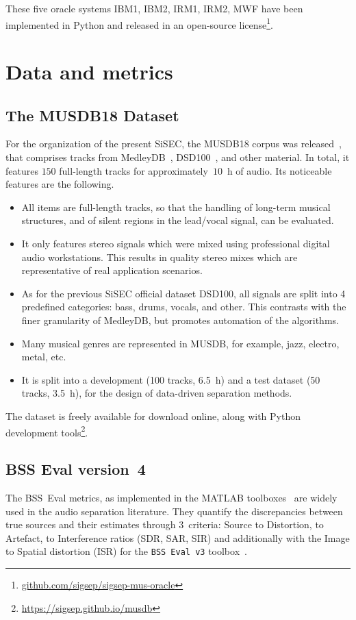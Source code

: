 \documentclass{llncs}
\begin{document}
These five oracle systems IBM1, IBM2, IRM1, IRM2, MWF have been implemented in Python and released in an open-source license\footnote{\url{github.com/sigsep/sigsep-mus-oracle}}.

\section{Data and metrics}

\subsection{The MUSDB18 Dataset}
For the organization of the present SiSEC, the MUSDB18 corpus was released~\cite{musdb18}, that comprises tracks from MedleyDB~\cite{medleydb}, DSD100~\cite{sisec2015,sisec2016}, and other material. In total, it features $150$ full-length tracks for approximately~$10$~h of audio. Its noticeable features are the following.
\begin{itemize}
\item All items are full-length tracks, so that the handling of long-term musical structures, and of silent regions in the lead/vocal signal, can be evaluated.
\item It only features stereo signals which were mixed using professional digital audio workstations. This results in quality stereo mixes which are representative of real application scenarios.
\item As for the previous SiSEC official dataset DSD100, all signals are split into 4 predefined categories: bass, drums, vocals, and other. This contrasts with the finer granularity of MedleyDB, but promotes automation of the algorithms.
\item Many musical genres are represented in MUSDB, for example, jazz, electro, metal, etc.
\item It is split into a development (100 tracks, 6.5~h) and a test dataset (50 tracks, 3.5~h), for the design of data-driven separation methods.
\end{itemize}
The dataset is freely available for download online, along with Python development tools\footnote{\url{https://sigsep.github.io/musdb}}.

\subsection{BSS Eval version~4}
\label{ssec:bsseval-results}

The BSS~Eval metrics, as implemented in the MATLAB toolboxes~\cite{bssevalv2,bssevalv3} are widely used in the audio separation literature. They quantify the discrepancies between true sources and their estimates through $3$~criteria: Source to Distortion, to Artefact, to Interference ratios (SDR, SAR, SIR) and additionally with the Image to Spatial distortion (ISR) for the \texttt{BSS~Eval v3} toolbox~\cite{bssevalv3}.
\end{document}
